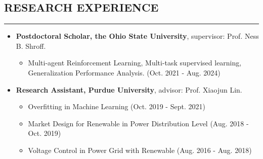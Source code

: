\documentclass[10pt,letter]{article}
\begin{document}
\begin{small}





\subsection*{RESEARCH EXPERIENCE}
\hrule
\vspace{0.2cm}
\begin{itemize}

\item {\bf Postdoctoral Scholar, the Ohio State University}, supervisor: Prof. Ness B. Shroff.
\begin{itemize}
    \item Multi-agent Reinforcement Learning, Multi-task supervised learning, Generalization Performance Analysis. (Oct. 2021 - Aug. 2024)
\end{itemize}

\item {\bf Research Assistant, Purdue University}, advisor: Prof. Xiaojun Lin.
\begin{itemize}
    \item Overfitting in Machine Learning (Oct. 2019 - Sept. 2021)
    \item Market Design for Renewable in Power Distribution Level (Aug. 2018 - Oct. 2019)
    \item Voltage Control in Power Grid with Renewable (Aug. 2016 - Aug. 2018)
\end{itemize}


\end{itemize}
\end{small}
\end{document}
